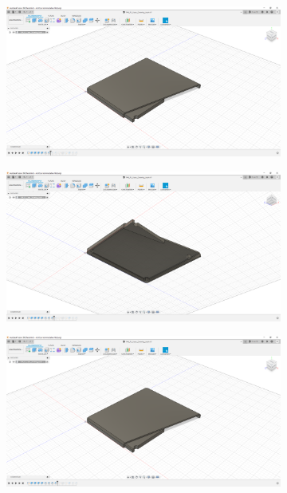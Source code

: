 \begin{figure}[h!tb]
\begin{subfigure}[t]{.3\linewidth}
		\caption[]{}
		\label{fig:design-back-06}
	\end{subfigure}
	\begin{subfigure}[t]{.3\linewidth}
		\includegraphics[width=\linewidth]{img/konstruktion_gehaeuse_hinten_007.png}
		\caption[]{}
		\label{fig:design-back-07}
	\end{subfigure}
	\begin{subfigure}[t]{.3\linewidth}
		\includegraphics[width=\linewidth]{img/konstruktion_gehaeuse_hinten_008.png}
		\caption[]{}
		\label{fig:design-back-08}
	\end{subfigure}
	\begin{subfigure}[t]{.3\linewidth}
		\includegraphics[width=\linewidth]{img/konstruktion_gehaeuse_hinten_009.png}

\end{subfigure}
\end{figure}
